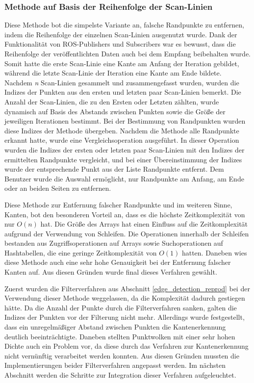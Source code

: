 \subsubsection{Methode auf Basis der Reihenfolge der Scan-Linien}
Diese Methode bot die simpelste Variante an, falsche Randpunkte zu entfernen, indem die Reihenfolge der einzelnen Scan-Linien ausgenutzt wurde. Dank der Funktionalität von ROS-Publishers und Subscribers war es bewusst, dass die Reihenfolge der veröffentlichten Daten auch bei dem Empfang beibehalten wurde. Somit hatte die erste Scan-Linie eine Kante am Anfang der Iteration gebildet, während die letzte Scan-Linie der Iteration eine Kante am Ende bildete. Nachdem \textit{n} Scan-Linien gesammelt und zusammengefasst wurden, wurden die Indizes der Punkten aus den ersten und letzten paar Scan-Linien bemerkt. Die Anzahl der Scan-Linien, die zu den Ersten oder Letzten zählten, wurde dynamisch auf Basis des Abstands zwischen Punkten sowie die Größe der jeweiligen Iterationen bestimmt. Bei der Bestimmung von Randpunkten wurden diese Indizes der Methode übergeben. Nachdem die Methode alle Randpunkte erkannt hatte, wurde eine Vergleichsoperation ausgeführt. In dieser Operation wurden die Indizes der ersten oder letzten paar Scan-Linien mit den Indizes der ermittelten Randpunkte vergleicht, und bei einer Übereinstimmung der Indizes wurde der entsprechende Punkt aus der Liste Randpunkte entfernt. Dem Benutzer wurde die Auswahl ermöglicht, nur Randpunkte am Anfang, am Ende oder an beiden Seiten zu entfernen.

Diese Methode zur Entfernung falscher Randpunkte und im weiteren Sinne, Kanten, bot den besonderen Vorteil an, dass es die höchste Zeitkomplexität von nur $O(n)$ hat. Die Größe des Arrays hat einen Einfluss auf die Zeitkomplexität aufgrund der Verwendung von Schleifen. Die Operationen innerhalb der Schleifen bestanden aus Zugriffsoperationen auf Arrays sowie Suchoperationen auf Hashtabellen, die eine geringe Zeitkomplexität von $O(1)$ hatten. Daneben wies diese Methode auch eine sehr hohe Genauigkeit bei der Entfernung falscher Kanten auf. Aus diesen Gründen wurde final dieses Verfahren gewählt.

Zuerst wurden die Filterverfahren aus Abschnitt \ref{edge_detection_reprod} bei der Verwendung dieser Methode weggelassen, da die Komplexität dadurch gestiegen hätte. Da die Anzahl der Punkte durch die Filterverfahren sanken, galten die Indizes der Punkten vor der Filterung nicht mehr. Allerdings wurde festgestellt, dass ein unregelmäßiger Abstand zwischen Punkten die Kantenerkennung deutlich beeinträchtigte. Daneben stellten Punktwolken mit einer sehr hohen Dichte auch ein Problem vor, da diese durch das Verfahren zur Kantenerkennung nicht vernünftig verarbeitet werden konnten. Aus diesen Gründen mussten die Implementierungen beider Filterverfahren angepasst werden. Im nächsten Abschnitt werden die Schritte zur Integration dieser Verfahren aufgeleuchtet. 

